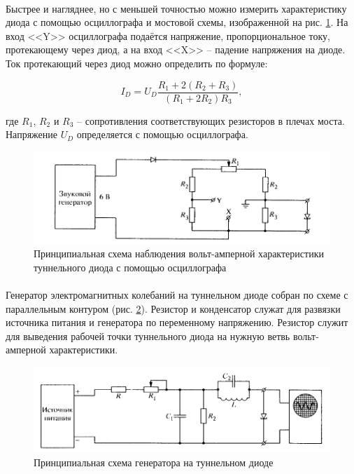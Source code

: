 \documentclass[a4paper,12pt]{article} %
\begin{document}
\paragraph{}
	Быстрее и нагляднее, но с меньшей точностью можно измерить характеристику диода с помощью осциллографа и мостовой схемы, изображенной на рис. \ref{fig:setup_osc}. На вход <<Y>> осциллографа подаётся напряжение, пропорциональное току, протекающему через диод, а на вход  <<X>>  -- падение напряжения на диоде. Ток протекающий через диод можно определить по формуле:
	
	\begin{equation}
	I_D = U_D \frac{R_1 + 2(R_2 + R_3)}{(R_1 + 2 R_2)R_3},
	\label{e:res}
	\end{equation}
	
	\noindent где $R_1$, $R_2$ и $R_3$ -- сопротивления соответствующих резисторов в плечах моста. Напряжение $U_D$ определяется с помощью осциллографа. 

\begin{figure}[h]
\centering
\includegraphics[width=\textwidth]{setup_osc.png}
\caption{Принципиальная схема наблюдения вольт-амперной характеристики туннельного диода с помощью осциллографа}
\label{fig:setup_osc}
\end{figure}


\paragraph{}
	Генератор электромагнитных колебаний на туннельном диоде собран по схеме с параллельным контуром (рис. \ref{fig:setup_gen}). Резистор и конденсатор служат для развязки источника питания и генератора по переменному напряжению. Резистор служит для выведения рабочей точки туннельного диода на нужную ветвь вольт-амперной характеристики.


\begin{figure}[h]
\centering
\includegraphics[width=\textwidth]{setup_gen.png}
\caption{Принципиальная схема генератора на туннельном диоде}
\label{fig:setup_gen}
\end{figure}
\end{document}
